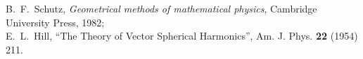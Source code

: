 \documentclass[12pt]{article}
\begin{document}
\begin{thebibliography}{0}
    B.~F.~Schutz, \emph{Geometrical methods of mathematical physics},
    Cambridge University Press, 1982;\\
    E.~L.~Hill, ``The Theory of Vector Spherical Harmonics'',
    Am. J. Phys. {\bf 22} (1954) 211.




    

\end{thebibliography}
\end{document}
